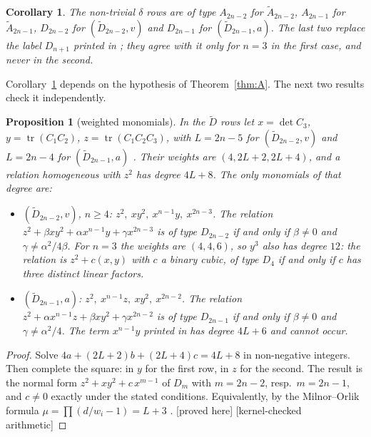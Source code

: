 \documentclass[11pt]{article}
\newtheorem{proposition}[theorem]{Proposition}
\newtheorem{corollary}[theorem]{Corollary}
\theoremstyle{definition}
\theoremstyle{remark}
\newcommand{\tagP}{\textsf{\small[proved here]}}
\newcommand{\tagK}{\textsf{\small[kernel-checked arithmetic]}}
\begin{document}
\begin{corollary}\label{cor:B}
The non-trivial $\delta$ rows are of type $A_{2n-2}$ for $\widetilde A_{2n-2}$, $A_{2n-1}$ for $\widetilde A_{2n-1}$, $D_{2n-2}$ for $(\widetilde D_{2n-2},v)$ and $D_{2n-1}$ for $(\widetilde D_{2n-1},a)$. The last two replace the label $D_{n+1}$ printed in \cite[Thm.~1.2]{Pinot}; they agree with it only for $n=3$ in the first case, and never in the second.
\end{corollary}

Corollary~\ref{cor:B} depends on the hypothesis of Theorem~\ref{thm:A}. The next two results check it independently.

\begin{proposition}[weighted monomials]\label{prop:enum}
In the $\widetilde D$ rows let $x=\det C_3$, $y=\operatorname{tr}(C_1C_2)$, $z=\operatorname{tr}(C_1C_2C_3)$, with $L=2n-5$ for $(\widetilde D_{2n-2},v)$ and $L=2n-4$ for $(\widetilde D_{2n-1},a)$ \cite[p.~18]{Pinot}. Their weights are $(4,2L+2,2L+4)$, and a relation homogeneous with $z^2$ has degree $4L+8$. The only monomials of that degree are:
\begin{itemize}[leftmargin=*]
\item $(\widetilde D_{2n-2},v)$, $n\ge4$: $z^2,\ xy^2,\ x^{n-1}y,\ x^{2n-3}$. The relation $z^2+\beta xy^2+\alpha x^{n-1}y+\gamma x^{2n-3}$ is of type $D_{2n-2}$ if and only if $\beta\ne0$ and $\gamma\neq\alpha^2/4\beta$. For $n=3$ the weights are $(4,4,6)$, so $y^3$ also has degree $12$: the relation is $z^2+c(x,y)$ with $c$ a binary cubic, of type $D_4$ if and only if $c$ has three distinct linear factors.
\item $(\widetilde D_{2n-1},a)$: $z^2,\ x^{n-1}z,\ xy^2,\ x^{2n-2}$. The relation $z^2+\alpha x^{n-1}z+\beta xy^2+\gamma x^{2n-2}$ is of type $D_{2n-1}$ if and only if $\beta\ne0$ and $\gamma\ne\alpha^2/4$. The term $x^{n-1}y$ printed in \cite[Lemma~3.27]{Pinot} has degree $4L+6$ and cannot occur.
\end{itemize}
\end{proposition}
\begin{proof}
Solve $4a+(2L+2)b+(2L+4)c=4L+8$ in non-negative integers. Then complete the square: in $y$ for the first row, in $z$ for the second. The result is the normal form $z^2+xy^2+c\,x^{m-1}$ of $D_m$ with $m=2n-2$, resp.\ $m=2n-1$, and $c\neq0$ exactly under the stated conditions. Equivalently, by the Milnor--Orlik formula $\mu=\prod(d/w_i-1)=L+3$ \cite{MO}. \tagP{} \tagK
\end{proof}
\end{document}
